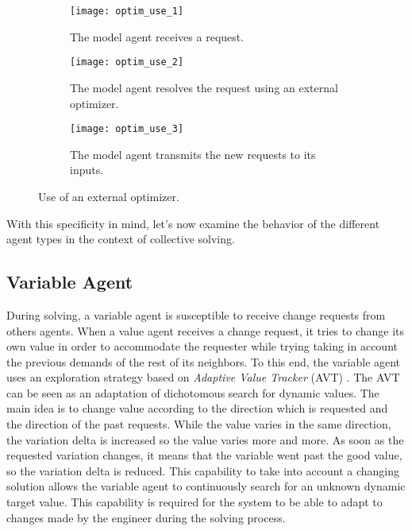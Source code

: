 \begin{figure}
	\centering
	\begin{subfigure}[b]{0.32\textwidth}
		\centering
		\texttt{[image: optim\_use\_1]}
		\caption{The model agent receives a request.}\label{optim_use:1}
	\end{subfigure}
	\hfill
	\begin{subfigure}[b]{0.32\textwidth}
		\centering
		\texttt{[image: optim\_use\_2]}
		\caption{The model agent resolves the request using an external optimizer.}\label{optim_use:2}
	\end{subfigure}
	\hfill
	\begin{subfigure}[b]{0.32\textwidth}
		\centering
		\texttt{[image: optim\_use\_3]}
		\caption{The model agent transmits the new requests to its inputs.}\label{optim_use:3}
	\end{subfigure}
	\caption{Use of an external optimizer.}\label{optim_use}
\end{figure}

With this specificity in mind, let's now examine the behavior of the different agent types in the context of collective solving.

\subsection{Variable Agent}\label{variable_agent_solving}

During solving, a variable agent is susceptible to receive change requests from others agents. When a value agent receives a change request, it tries to change its own value  in order to accommodate the requester while trying taking in account the previous demands of the rest of its neighbors. To this end, the variable agent  uses an exploration strategy based on \emph{Adaptive Value Tracker} (AVT) \cite{Lemouzy_2011}. The AVT can be seen as an adaptation of dichotomous search for dynamic values. The main idea is to change value according to the direction which is requested and the direction of the past requests. While the value varies in the same direction, the variation delta is increased so the value varies more and more. As soon as the requested variation changes, it means that the variable went past the good value, so the variation delta is reduced.
This capability to take into account a changing solution allows the variable agent to continuously search for an unknown dynamic target value. This capability is required for the system to be able to adapt to changes made by the engineer during the solving process.

